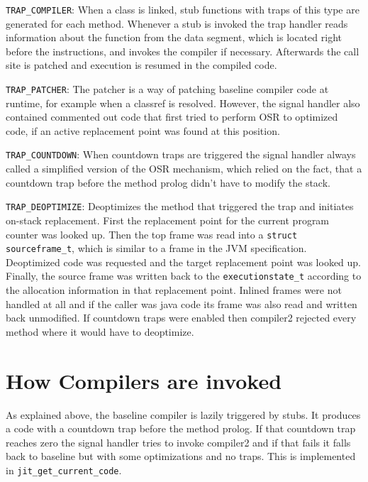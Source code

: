 \documentclass[draft,final]{vutinfth} %
\begin{document}
    \lstinline{TRAP_COMPILER}:
    When a class is linked, stub functions with traps of this type are generated for each method.
    Whenever a stub is invoked the trap handler reads information about the function from the
    data segment, which is located right before the instructions, and invokes the compiler if necessary.
    Afterwards the call site is patched and execution is resumed in the compiled code.

    \lstinline{TRAP_PATCHER}:
    The patcher is a way of patching baseline compiler code at runtime, for example when a classref is resolved.
    However, the signal handler also contained commented out code that first tried to perform OSR to optimized code, if an active replacement point was found at this position.

    \lstinline{TRAP_COUNTDOWN}:
    When countdown traps are triggered
    the signal handler always called a simplified version of the OSR mechanism, which relied on the fact,
    that a countdown trap before the method prolog didn't have to modify the stack.

    \lstinline{TRAP_DEOPTIMIZE}:
    Deoptimizes the method that triggered the trap and initiates on-stack replacement.
    First the replacement point for the current program counter was looked up.
    Then the top frame was read into a \lstinline{struct sourceframe_t}, which is similar to a frame in the JVM specification.
    Deoptimized code was requested and the target replacement point was looked up.
    Finally, the source frame was written back to the \lstinline{executionstate_t} according to the allocation information in that replacement point.
    Inlined frames were not handled at all and if the caller was java code its frame was also read and written back unmodified.
    If countdown traps were enabled then compiler2 rejected every method where it would have to deoptimize.


    \section{How Compilers are invoked}

    As explained above, the baseline compiler is lazily triggered by stubs.
    It produces a code with a countdown trap before the method prolog.
    If that countdown trap reaches zero the signal handler
    tries to invoke compiler2 and if that fails it
    falls back to baseline but with some optimizations and no traps.
    This is implemented in \lstinline{jit_get_current_code}.
\end{document}
